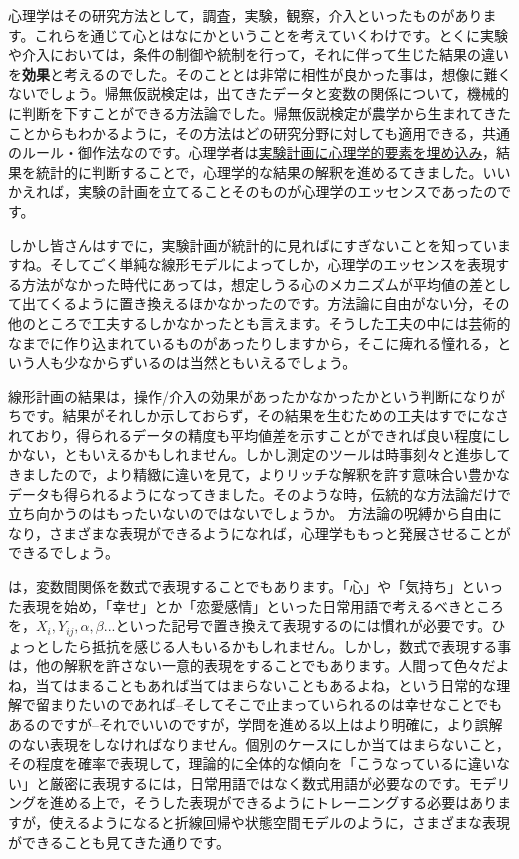 \documentclass{ltjsbook}
\begin{document}
心理学はその研究方法として，調査，実験，観察，介入といったものがあります。これらを通じて心とはなにかということを考えていくわけです。とくに実験や介入においては，条件の制御や統制を行って，それに伴って生じた結果の違いを\textbf{効果}と考えるのでした。そのこととは非常に相性が良かった事は，想像に難くないでしょう。帰無仮説検定は，出てきたデータと変数の関係について，機械的に判断を下すことができる方法論でした。帰無仮説検定が農学から生まれてきたことからもわかるように，その方法はどの研究分野に対しても適用できる，共通のルール・御作法なのです。心理学者は\underline{実験計画に心理学的要素を埋め込み}，結果を統計的に判断することで，心理学的な結果の解釈を進めるてきました。いいかえれば，実験の計画を立てることそのものが心理学のエッセンスであったのです。

しかし皆さんはすでに，実験計画が統計的に見ればにすぎないことを知っていますね。そしてごく単純な線形モデルによってしか，心理学のエッセンスを表現する方法がなかった時代にあっては，想定しうる心のメカニズムが平均値の差として出てくるように置き換えるほかなかったのです。方法論に自由がない分，その他のところで工夫するしかなかったとも言えます。そうした工夫の中には芸術的なまでに作り込まれているものがあったりしますから，そこに痺れる憧れる，という人も少なからずいるのは当然ともいえるでしょう。

線形計画の結果は，操作/介入の効果があったかなかったかという判断になりがちです。結果がそれしか示しておらず，その結果を生むための工夫はすでになされており，得られるデータの精度も平均値差を示すことができれば良い程度にしかない，ともいえるかもしれません。しかし測定のツールは時事刻々と進歩してきましたので，より精緻に違いを見て，よりリッチな解釈を許す意味合い豊かなデータも得られるようになってきました。そのような時，伝統的な方法論だけで立ち向かうのはもったいないのではないでしょうか。
方法論の呪縛から自由になり，さまざまな表現ができるようになれば，心理学ももっと発展させることができるでしょう。

は，変数間関係を数式で表現することでもあります。「心」や「気持ち」といった表現を始め，「幸せ」とか「恋愛感情」といった日常用語で考えるべきところを，$X_i,Y_{ij},\alpha,\beta...$といった記号で置き換えて表現するのには慣れが必要です。ひょっとしたら抵抗を感じる人もいるかもしれません。しかし，数式で表現する事は，他の解釈を許さない一意的表現をすることでもあります。人間って色々だよね，当てはまることもあれば当てはまらないこともあるよね，という日常的な理解で留まりたいのであれば--そしてそこで止まっていられるのは幸せなことでもあるのですが--それでいいのですが，学問を進める以上はより明確に，より誤解のない表現をしなければなりません。個別のケースにしか当てはまらないこと，その程度を確率で表現して，理論的に全体的な傾向を「こうなっているに違いない」と厳密に表現するには，日常用語ではなく数式用語が必要なのです。モデリングを進める上で，そうした表現ができるようにトレーニングする必要はありますが，使えるようになると折線回帰や状態空間モデルのように，さまざまな表現ができることも見てきた通りです。
\end{document}
